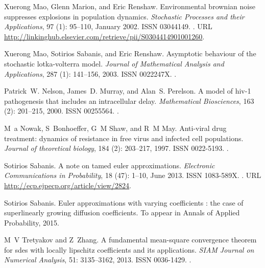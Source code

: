 \documentclass[sort&compress, preprint]{elsarticle}
\theoremstyle{definition}
\theoremstyle{plain}%
\theoremstyle{remark}
\begin{document}
\begin{thebibliography}{36}
Xuerong Mao, Glenn Marion, and Eric Renshaw.
\newblock Environmental brownian noise suppresses explosions in population
  dynamics.
\newblock \emph{Stochastic Processes and their Applications}, 97
  (1): 95--110, January 2002.
\newblock ISSN 03044149.
\newblock {}.
\newblock URL
  \url{http://linkinghub.elsevier.com/retrieve/pii/S0304414901001260}.

Xuerong Mao, Sotirios Sabanis, and Eric Renshaw.
\newblock Asymptotic behaviour of the stochastic lotka-volterra model.
\newblock \emph{Journal of Mathematical Analysis and Applications},
  287 (1): 141--156, 2003.
\newblock ISSN 0022247X.
\newblock {}.

Patrick~W. Nelson, James~D. Murray, and Alan~S. Perelson.
\newblock A model of hiv-1 pathogenesis that includes an intracellular delay.
\newblock \emph{Mathematical Biosciences}, 163 (2): 201--215,
  2000.
\newblock ISSN 00255564.
\newblock {}.

M~a Nowak, S~Bonhoeffer, G~M Shaw, and R~M May.
\newblock Anti-viral drug treatment: dynamics of resistance in free virus and
  infected cell populations.
\newblock \emph{Journal of theoretical biology}, 184 (2):
  203--217, 1997.
\newblock ISSN 0022-5193.
\newblock {}.

Sotirios Sabanis.
\newblock A note on tamed euler approximations.
\newblock \emph{Electronic Communications in Probability}, 18
  (47): 1--10, June 2013.
\newblock ISSN 1083-589X.
\newblock {}.
\newblock URL \url{http://ecp.ejpecp.org/article/view/2824}.

Sotirios Sabanis.
\newblock Euler approximations with varying coefficients : the case of
  superlinearly growing diffusion coefficients.
\newblock To appear in Annals of Applied Probability, 2015.

M~V Tretyakov and Z~Zhang.
\newblock A fundamental mean-square convergence theorem for sdes with locally
  lipschitz coefficients and its applications.
\newblock \emph{SIAM Journal on Numerical Analysis}, 51: 3135--3162,
  2013{}.
\newblock ISSN 0036-1429.
\newblock {}.


\end{thebibliography}
\end{document}
